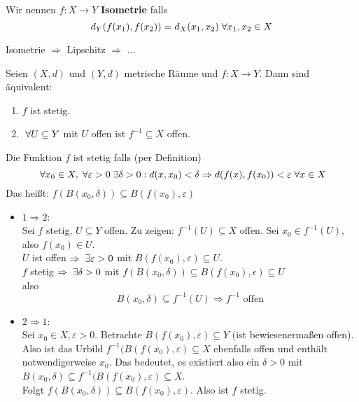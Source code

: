 \documentclass[main.tex]{subfiles}
\begin{document}
\begin{Definition}[Isometrie]
  Wir nennen $f:X\to Y$ \textbf{Isometrie} falls
  $$d_Y(f(x_1),f(x_2)) = d_X (x_1,x_2) \;\forall x_1,x_2 \in X$$
\end{Definition}

\begin{Theorem}
  \begin{center}
    Isometrie $\Rightarrow$ Lipschitz $\Rightarrow$ ...
  \end{center}
\end{Theorem}

\begin{Theorem}
  Seien $(X,d)$ und $(Y,d)$ metrische Räume und $f:X \to Y$. Dann sind äquivalent:
  \begin{enumerate}
    \item $f$ ist stetig.
    \item $\;\forall U \subseteq Y$ mit $U$ offen ist $f^{-1} \subseteq X$ offen.
  \end{enumerate}
\end{Theorem}

\begin{Beweis}
  Die Funktion $f$ ist stetig falls (per Definition)
  $$\;\forall x_0 \in X, \;\forall \varepsilon > 0 \;\exists \delta >0 : d(x,x_0)<\delta \Rightarrow d(f(x),f(x_0)) < \varepsilon \;\forall x \in X$$
  Das heißt: $f(B(x_0,\delta)) \subseteq B(f(x_0),\varepsilon)$
  \begin{itemize}
    \item $1 \Rightarrow 2$:\\
      Sei $f$ stetig, $U \subseteq Y$ offen. Zu zeigen: $f^{-1}(U) \subseteq X$ offen. Sei $x_0 \in f^{-1}(U)$, also $f(x_0) \in U$.\\
      $U$ ist offen $\Rightarrow \;\exists \varepsilon > 0$ mit $B(f(x_0),\varepsilon) \subseteq U$.\\
      $f$ stetig $\Rightarrow \;\exists \delta > 0$ mit $f(B(x_0,\delta)) \subseteq B(f(x_0),\epsilon) \subseteq U$\\
      also
      $$B(x_0,\delta) \subseteq f^{-1}(U) \Rightarrow f^{-1} \text{ offen}$$
    \item $2 \Rightarrow 1$:\\
      Sei $x_0 \in X, \varepsilon > 0$. Betrachte $B(f(x_0),\varepsilon) \subseteq Y$ (ist bewiesenermaßen offen). Also ist das Urbild $f^{-1}(B(f(x_0),\varepsilon) \subseteq X$ ebenfalls offen und enthält notwendigerweise $x_0$. Das bedeutet, es existiert also ein $\delta > 0$ mit $B(x_0,\delta) \subseteq f^{-1}(B(f(x_0),\varepsilon) \subseteq X$.\\
      Folgt $f(B(x_0,\delta)) \subseteq B(f(x_0),\varepsilon)$. Also ist $f$ stetig.
  \end{itemize}
\end{Beweis}
\end{document}
